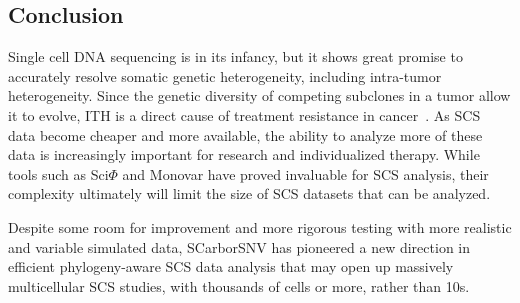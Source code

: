 \documentclass[../main.tex]{subfiles}
\begin{document}
\subsection{Conclusion}
Single cell DNA sequencing is in its infancy, but it shows great promise to accurately resolve somatic genetic heterogeneity, including intra-tumor heterogeneity.
Since the genetic diversity of competing subclones in a tumor allow it to evolve, ITH is a direct cause of treatment resistance in cancer~\cite{metastatic, merlo2006cancer, greaves2012clonal}.
As SCS data become cheaper and more available, the ability to analyze more of these data is increasingly important for research and individualized therapy.
While tools such as Sci$\Phi$ and Monovar have proved invaluable for SCS analysis, their complexity ultimately will limit the size of SCS datasets that can be analyzed.

Despite some room for improvement and more rigorous testing with more realistic and variable simulated data, SCarborSNV has pioneered a new direction in efficient phylogeny-aware SCS data analysis that may open up massively multicellular SCS studies, with thousands of cells or more, rather than 10s.
\end{document}
